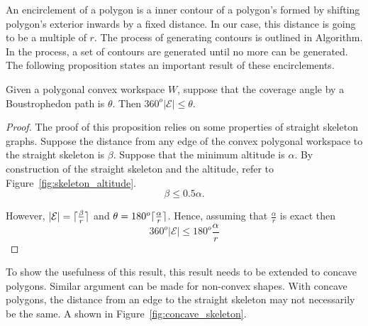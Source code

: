 \documentclass[../main.tex]{subfiles}
\begin{document}


An encirclement of a polygon is a inner contour of a polygon's formed by shifting polygon's exterior inwards by a fixed distance. In our case, this distance is going to be a multiple of $r$. The process of generating contours is outlined in Algorithm. In the process, a set of contours are generated until no more can be generated. The following proposition states an important result of these encirclements.
\begin{proposition}
	Given a polygonal convex workspace $W$, suppose that the coverage angle by a Boustrophedon path is $\theta$. Then $360^o|\mathcal{E}|\leq\theta$.
\end{proposition}
\begin{proof}

The proof of this proposition relies on some properties of straight skeleton graphs. Suppose the distance from any edge of the convex polygonal workspace to the straight skeleton is $\beta$. Suppose that the minimum altitude is $\alpha$. By construction of the straight skeleton and the altitude, refer to Figure~\ref{fig:skeleton_altitude}.
\begin{equation}
	\beta\leq 0.5\alpha.
\end{equation}

However, $|\mathcal{E}|=\lceil\frac{\beta}{r}\rceil$ and $\theta=180^o\lceil\frac{\alpha}{r}\rceil$. Hence, assuming that $\frac{\alpha}{r}$ is exact then
\begin{equation}
 360^o|\mathcal{E}|\leq180^o\frac{\alpha}{r}
 \end{equation}
\end{proof}

To show the usefulness of this result, this result needs to be extended to concave polygons. Similar argument can be made for non-convex shapes. With concave polygons, the distance from an edge to the straight skeleton may not necessarily be the same. A shown in Figure~\ref{fig:concave_skeleton}.
\end{document}

